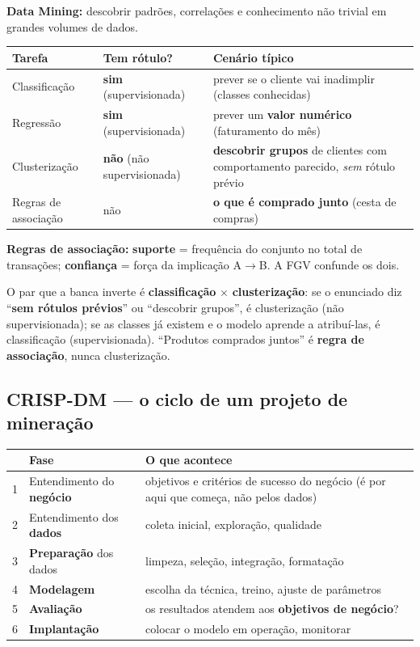 \textbf{Data Mining:} descobrir padrões, correlações e conhecimento não
trivial em grandes volumes de dados.

\begin{center}
\begin{tabular}{@{}p{3.2cm}p{3.2cm}p{4.4cm}@{}}
\toprule
\textbf{Tarefa} & \textbf{Tem rótulo?} & \textbf{Cenário típico} \\
\midrule
Classificação & \textbf{sim} (supervisionada) & prever se o cliente vai inadimplir (classes conhecidas) \\
Regressão & \textbf{sim} (supervisionada) & prever um \textbf{valor numérico} (faturamento do mês) \\
Clusterização & \textbf{não} (não supervisionada) & \textbf{descobrir grupos} de clientes com comportamento parecido, \emph{sem} rótulo prévio \\
Regras de associação & não & \textbf{o que é comprado junto} (cesta de compras) \\
\bottomrule
\end{tabular}
\end{center}

\textbf{Regras de associação:} \textbf{suporte} = frequência do conjunto no
total de transações; \textbf{confiança} = força da implicação A$\to$B. A FGV
confunde os dois.

\begin{pegadinha}
O par que a banca inverte é \textbf{classificação} $\times$
\textbf{clusterização}: se o enunciado diz ``\textbf{sem rótulos prévios}''
ou ``descobrir grupos'', é clusterização (não supervisionada); se as classes
já existem e o modelo aprende a atribuí-las, é classificação
(supervisionada). ``Produtos comprados juntos'' é \textbf{regra de
associação}, nunca clusterização.
\end{pegadinha}

\subsection{CRISP-DM --- o ciclo de um projeto de mineração}

\begin{center}
\begin{tabular}{@{}p{0.6cm}p{3.6cm}p{6.8cm}@{}}
\toprule
& \textbf{Fase} & \textbf{O que acontece} \\
\midrule
1 & Entendimento do \textbf{negócio} & objetivos e critérios de sucesso do negócio (é por aqui que começa, não pelos dados) \\
2 & Entendimento dos \textbf{dados} & coleta inicial, exploração, qualidade \\
3 & \textbf{Preparação} dos dados & limpeza, seleção, integração, formatação \\
4 & \textbf{Modelagem} & escolha da técnica, treino, ajuste de parâmetros \\
5 & \textbf{Avaliação} & os resultados atendem aos \textbf{objetivos de negócio}? \\
6 & \textbf{Implantação} & colocar o modelo em operação, monitorar \\
\bottomrule
\end{tabular}
\end{center}

